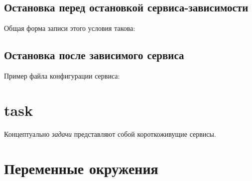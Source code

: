 \subsection{Остановка перед остановкой сервиса-зависимости}
Общая форма записи этого условия такова: \begin{alltt}
\end{alltt}
\subsection{Остановка после зависимого сервиса}
Пример файла конфигурации сервиса: \begin{alltt}
\end{alltt}
\section{task}
Концептуально \textit{задачи} представляют собой короткоживущие сервисы.
\section{Переменные окружения} \label{sec:EnviromentVariables}